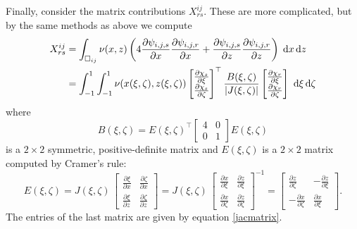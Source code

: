 \documentclass[11pt,final,reqno]{amsart}
\theoremstyle{remark}
\theoremstyle{definition}
\begin{document}
Finally, consider the matrix contributions $X^{ij}_{rs}$.  These are more complicated, but by the same methods as above we compute
\begin{align}
  X^{ij}_{rs} &= \int_{\square_{ij}} \nu(x,z) \left(4\frac{\partial\psi_{i,j,s}}{\partial x} \frac{\partial\psi_{i,j,r}}{\partial x} + \frac{\partial\psi_{i,j,s}}{\partial z} \frac{\partial\psi_{i,j,r}}{\partial z}\right)\;\mathrm{d}x\,\mathrm{d}z \notag \\
   &= \int_{-1}^1 \int_{-1}^1 \nu(x(\xi,\zeta),z(\xi,\zeta)) \begin{bmatrix}\frac{\partial\chi_{s}}{\partial \xi} \\ \frac{\partial\chi_{s}}{\partial \zeta}\end{bmatrix}^\top \frac{B(\xi,\zeta)}{|J(\xi,\zeta)|} \begin{bmatrix}\frac{\partial\chi_{r}}{\partial \xi} \\ \frac{\partial\chi_{r}}{\partial \zeta}\end{bmatrix}\, \,\mathrm{d}\xi\,\mathrm{d}\zeta \label{integralforX}
\end{align}
where 
\begin{equation}
B(\xi,\zeta) = E(\xi,\zeta)^\top \begin{bmatrix} 4 & 0 \\ 0 & 1 \end{bmatrix} E(\xi,\zeta) \label{Bmatrixdefn}
\end{equation}
is a $2\times 2$ symmetric, positive-definite matrix and $E(\xi,\zeta)$ is a $2\times 2$ matrix computed by Cramer's rule:
\begin{equation}
E(\xi,\zeta) = J(\xi,\zeta)\, \begin{bmatrix}
    \frac{\partial \xi}{\partial x} & \frac{\partial \zeta}{\partial x} \\
    \frac{\partial \xi}{\partial z} & \frac{\partial \zeta}{\partial z}
  \end{bmatrix} 
  = J(\xi,\zeta)\, \begin{bmatrix}
    \frac{\partial x}{\partial \xi} & \frac{\partial z}{\partial \xi} \\
    \frac{\partial x}{\partial \zeta} & \frac{\partial z}{\partial \zeta}
  \end{bmatrix}^{-1}
  = \begin{bmatrix}
    \frac{\partial z}{\partial \zeta} & -\frac{\partial z}{\partial \xi} \\
    -\frac{\partial x}{\partial \zeta} & \frac{\partial x}{\partial \xi}
  \end{bmatrix}.   \label{Ematrixdefn}
\end{equation}
The entries of the last matrix are given by equation \eqref{jacmatrix}.
\end{document}
